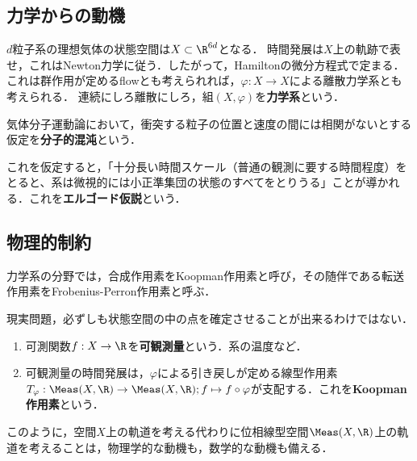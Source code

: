 \documentclass[uplatex,dvipdfmx]{jsreport}
\begin{document}
\subsection{力学からの動機}

\begin{discussion}[問題設定]
    $d$粒子系の理想気体の状態空間は$X\subset\R^{6d}$となる．
    時間発展は$X$上の軌跡で表せ，これはNewton力学に従う．したがって，Hamiltonの微分方程式で定まる．
    これは群作用が定めるflowとも考えられれば，$\varphi:X\to X$による離散力学系とも考えられる．
    連続にしろ離散にしろ，組$(X,\varphi)$を\textbf{力学系}という．
\end{discussion}

\begin{definition}
    気体分子運動論において，衝突する粒子の位置と速度の間には相関がないとする仮定を\textbf{分子的混沌}という．
\end{definition}
\begin{remarks}
    これを仮定すると，「十分長い時間スケール（普通の観測に要する時間程度）をとると、系は微視的には小正準集団の状態のすべてをとりうる」ことが導かれる．これを\textbf{エルゴード仮説}という．
\end{remarks}

\subsection{物理的制約}

\begin{tcolorbox}[colframe=ForestGreen, colback=ForestGreen!10!white,breakable,colbacktitle=ForestGreen!40!white,coltitle=black,fonttitle=\bfseries\sffamily,
title=]
    力学系の分野では，合成作用素をKoopman作用素と呼び，その随伴である転送作用素をFrobenius-Perron作用素と呼ぶ．
\end{tcolorbox}

\begin{definition}
    現実問題，必ずしも状態空間の中の点を確定させることが出来るわけではない．
    \begin{enumerate}
        \item 可測関数$f:X\to\R$を\textbf{可観測量}という．系の温度など．
        \item 可観測量の時間発展は，$\varphi$による引き戻しが定める線型作用素$T_\varphi:\Meas(X,\R)\to\Meas(X,\R);f\mapsto f\circ\varphi$が支配する．これを\textbf{Koopman作用素}という．
    \end{enumerate}
\end{definition}
\begin{remarks}
    このように，空間$X$上の軌道を考える代わりに位相線型空間$\Meas(X,\R)$上の軌道を考えることは，物理学的な動機も，数学的な動機も備える．
\end{remarks}
\end{document}
